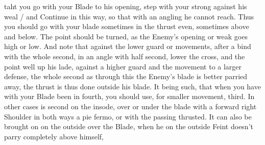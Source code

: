 \newpage


\newpage

taht you go with your Blade to his opening, step with your strong
against his weal / and Continue in this way, so that with an angling he
cannot reach. Thus you should go with your blade sometimes in the
thrust even, sometimes above and below. The point should be turned, as
the Enemy's opening or weak goes high or low.
And note that against the lower guard or movements, after a bind with
the whole second, in an angle with half second, lower the cross, and
the point well up his lade, against a higher guard and the movement to
a larger defense, the whole second as through this the Enemy's blade
is better parried away, the thrust is thus done outside his blade. It
being such, that when you have with your Blade been in fourth, you
should use, for smaller movement, third. 
In other cases is second on the insode, over or under the blade with a
forward right Shoulder in both ways a pie fermo, or with the passing
thrusted. It can also be brought on on the outside over the Blade,
when he on the outside Feint doesn't parry completely above himself,
